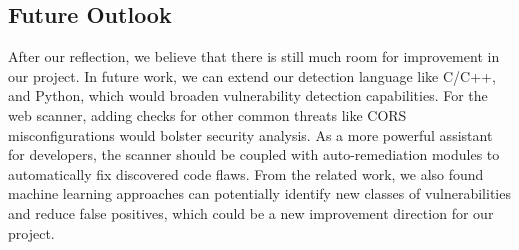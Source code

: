\documentclass[journal]{IEEEtran}
\begin{document}
\subsection*{Future Outlook}
After our reflection, we believe that there is still much room for improvement in our project. In future work, we can extend our detection language like C/C++, and Python, which would broaden vulnerability detection capabilities. For the web scanner, adding checks for other common threats like CORS misconfigurations would bolster security analysis. As a more powerful assistant for developers, the scanner should be coupled with auto-remediation modules to automatically fix discovered code flaws. From the related work, we also found machine learning approaches can potentially identify new classes of vulnerabilities and reduce false positives, which could be a new improvement direction for our project.

 

\vspace{-5 mm}


\end{document}
